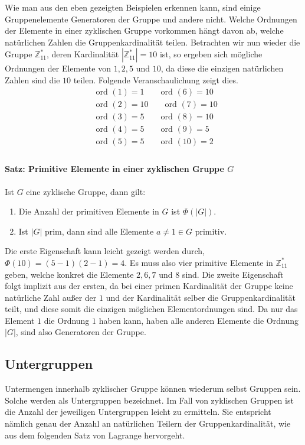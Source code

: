 Wie man aus den eben gezeigten Beispielen erkennen kann, sind einige Gruppenelemente Generatoren der Gruppe und andere nicht. Welche Ordnungen der Elemente in einer zyklischen Gruppe vorkommen hängt davon ab, welche natürlichen Zahlen die Gruppenkardinalität teilen. Betrachten wir nun wieder die Gruppe $\mathbb{Z}^*_{11}$, deren Kardinalität $|\mathbb{Z}^*_{11}| = 10$ ist, so ergeben sich mögliche Ordnungen der Elemente von $1,2,5 \text{ und }10$, da diese die einzigen natürlichen Zahlen sind die $10$ teilen. Folgende Veranschaulichung zeigt dies.
\begin{align*}
&\text{ord }(1) = 1 \qquad \text{ord }(6) = 10\\
&\text{ord }(2) = 10 \qquad \text{ord }(7) = 10\\
&\text{ord }(3) = 5 \qquad \text{ord }(8) = 10\\
&\text{ord }(4) = 5 \qquad \text{ord }(9) = 5\\
&\text{ord }(5) = 5 \qquad \text{ord }(10) = 2\\
\end{align*}

\paragraph{Satz: Primitive Elemente in einer zyklischen Gruppe $G$}
Ist $G$ eine zyklische Gruppe, dann gilt:
\begin{enumerate}
\item Die Anzahl der primitiven Elemente in $G$ ist $\Phi (|G|)$.
\item Ist $|G|$ prim, dann sind alle Elemente $a \neq 1 \in G$ primitiv.
\end{enumerate}

Die erste Eigenschaft kann leicht gezeigt werden durch, $\Phi(10) = (5-1)(2-1) = 4$. Es muss also vier primitive Elemente in $\mathbb{Z}^*_{11}$ geben, welche konkret die Elemente $2,6,7$ und $8$ sind. Die zweite Eigenschaft folgt implizit aus der ersten, da bei einer primen Kardinalität der Gruppe keine natürliche Zahl außer der $1$ und der Kardinalität selber die Gruppenkardinalität teilt, und diese somit die einzigen möglichen Elementordnungen sind. Da nur das Element $1$ die Ordnung $1$ haben kann, haben alle anderen Elemente die Ordnung $|G|$, sind also Generatoren der Gruppe.

\subsection{Untergruppen}
Untermengen innerhalb zyklischer Gruppe können wiederum selbst Gruppen sein. Solche werden als Untergruppen bezeichnet. Im Fall von zyklischen Gruppen ist die Anzahl der jeweiligen Untergruppen leicht zu ermitteln. Sie entspricht nämlich genau der Anzahl an natürlichen Teilern der Gruppenkardinalität, wie aus dem folgenden Satz von Lagrange hervorgeht.

